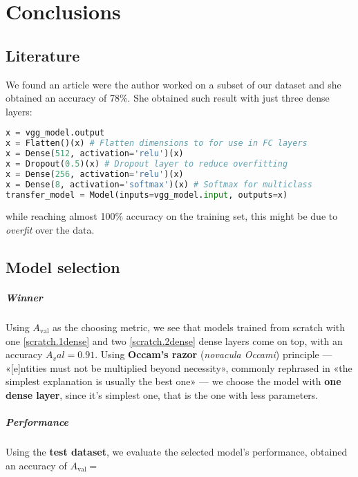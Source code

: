 \chapter{Conclusions}

\section{Literature}

We found an article \cite{womansarticle} were the author worked on a subset of our dataset and she obtained an accuracy of 78\%. She obtained such result with just three dense layers:

\begin{lstlisting}[language=Python]
x = vgg_model.output
x = Flatten()(x) # Flatten dimensions to for use in FC layers
x = Dense(512, activation='relu')(x)
x = Dropout(0.5)(x) # Dropout layer to reduce overfitting
x = Dense(256, activation='relu')(x)
x = Dense(8, activation='softmax')(x) # Softmax for multiclass
transfer_model = Model(inputs=vgg_model.input, outputs=x)	
\end{lstlisting}

while reaching almost 100\% accuracy on the training set, this might be due to \emph{overfit} over the data.

\section{Model selection}

\paragraph{Winner}
Using $A_\text{val}$ as the choosing metric, we see that models trained from scratch with one \ref{scratch.1dense} and two \ref{scratch.2dense} dense layers come on top, with an accuracy $A_val = 0.91$. Using \textbf{Occam's razor} (\textit{novacula Occami}) principle --- «[e]ntities must not be multiplied beyond necessity», commonly rephrased in «the simplest explanation is usually the best one» \cite{enwiki:1173975697} --- we choose the model with \textbf{one dense layer}, since it's simplest one, that is the one with less parameters.

\paragraph{Performance}
Using the \textbf{test dataset}, we evaluate the selected model's performance, obtained an accuracy of $A_\text{val} = $